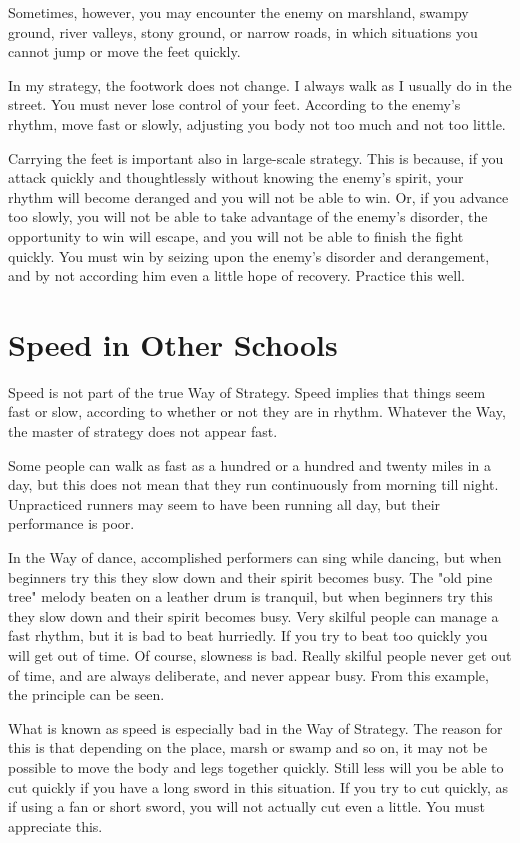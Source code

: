 \documentclass[12pt]{report}
\begin{document}
Sometimes, however, you may encounter the enemy on marshland, swampy ground, river valleys, stony ground, or narrow roads, in which situations you cannot jump or move the feet quickly.

In my strategy, the footwork does not change. I always walk as I usually do in the street. You must never lose control of your feet. According to the enemy's rhythm, move fast or slowly, adjusting you body not too much and not too little.

Carrying the feet is important also in large-scale strategy. This is because, if you attack quickly and thoughtlessly without knowing the enemy's spirit, your rhythm will become deranged and you will not be able to win. Or, if you advance too slowly, you will not be able to take advantage of the enemy's disorder, the opportunity to win will escape, and you will not be able to finish the fight quickly. You must win by seizing upon the enemy's disorder and derangement, and by not according him even a little hope of recovery. Practice this well.
\section*{Speed in Other Schools}
Speed is not part of the true Way of Strategy. Speed implies that things seem fast or slow, according to whether or not they are in rhythm. Whatever the Way, the master of strategy does not appear fast.

Some people can walk as fast as a hundred or a hundred and twenty miles in a day, but this does not mean that they run continuously from morning till night. Unpracticed runners may seem to have been running all day, but their performance is poor.

In the Way of dance, accomplished performers can sing while dancing, but when beginners try this they slow down and their spirit becomes busy. The "old pine tree" melody beaten on a leather drum is tranquil, but when beginners try this they slow down and their spirit becomes busy. Very skilful people can manage a fast rhythm, but it is bad to beat hurriedly. If you try to beat too quickly you will get out of time. Of course, slowness is bad. Really skilful people never get out of time, and are always deliberate, and never appear busy. From this example, the principle can be seen.

What is known as speed is especially bad in the Way of Strategy. The reason for this is that depending on the place, marsh or swamp and so on, it may not be possible to move the body and legs together quickly. Still less will you be able to cut quickly if you have a long sword in this situation. If you try to cut quickly, as if using a fan or short sword, you will not actually cut even a little. You must appreciate this.
\end{document}
